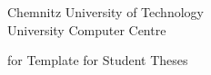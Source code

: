 \begin{tuctitlepage}
\begin{tuctitleorgunit}
Chemnitz University of Technology \\
University Computer Centre \\
\end{tuctitleorgunit}

\tuctitlelogo

\bigskip
\begin{tuctitleblock}{for}
{\LARGE Template for Student Theses}
\end{tuctitleblock}
\bigskip
\renewcommand{\tuctitleauthorphrase}{by}

\vfill

\end{tuctitlepage}
